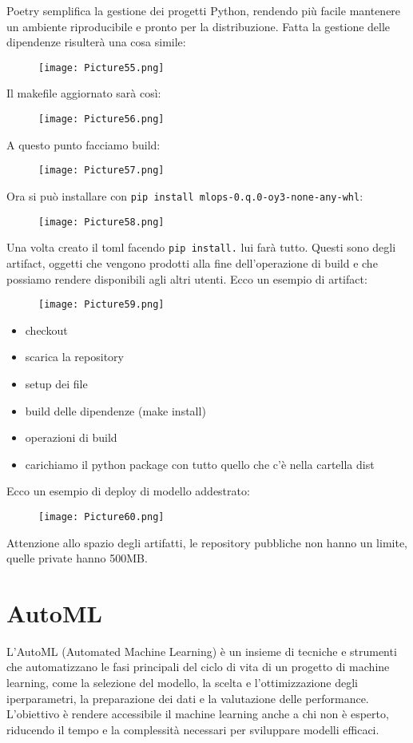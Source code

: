 \documentclass[a4paper,12pt]{article}
\begin{document}
\noindent Poetry semplifica la gestione dei progetti Python, rendendo più facile mantenere un ambiente riproducibile e pronto per la distribuzione.
Fatta la gestione delle dipendenze risulterà una cosa simile:
\begin{figure}[H]
    \centering
    \texttt{[image: Picture55.png]}
\end{figure}
\noindent Il makefile aggiornato sarà così:
\begin{figure}[H]
    \centering
    \texttt{[image: Picture56.png]}
\end{figure}
\noindent A questo punto facciamo build:
\begin{figure}[H]
    \centering
    \texttt{[image: Picture57.png]}
\end{figure}
\noindent Ora si può installare con \texttt{pip install mlops-0.q.0-oy3-none-any-whl}:
\begin{figure}[H]
    \centering
    \texttt{[image: Picture58.png]}
\end{figure}
\noindent Una volta creato il toml facendo \texttt{pip install.} lui farà tutto.
Questi sono degli artifact, oggetti che vengono prodotti alla fine dell'operazione di build e che possiamo rendere disponibili agli altri utenti.
\newline 
Ecco un esempio di artifact:
\begin{figure}[H]
    \centering
    \texttt{[image: Picture59.png]}
\end{figure}
\begin{itemize}
    \item checkout
    \item scarica la repository 
    \item setup dei file 
    \item build delle dipendenze (make install)
    \item operazioni di build 
    \item carichiamo il python package con tutto quello che c'è nella cartella dist
\end{itemize}
Ecco un esempio di deploy di modello addestrato:
\begin{figure}[H]
    \centering
    \texttt{[image: Picture60.png]}
\end{figure}
\noindent Attenzione allo spazio degli artifatti, le repository pubbliche non hanno un limite, quelle private hanno 500MB. 

\section{AutoML}
L'AutoML (Automated Machine Learning) è un insieme di tecniche e strumenti che automatizzano le fasi principali del ciclo di vita di un progetto di machine learning, come la selezione del modello, la scelta e l'ottimizzazione degli iperparametri, la preparazione dei dati e la valutazione delle performance. L'obiettivo è rendere accessibile il machine learning anche a chi non è esperto, riducendo il tempo e la complessità necessari per sviluppare modelli efficaci.
\end{document}
